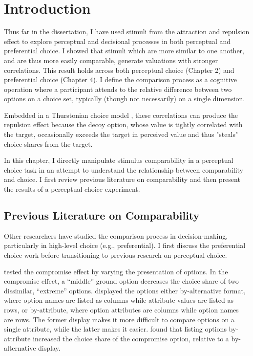 \section{Introduction}

Thus far in the dissertation, I have used stimuli from the attraction and repulsion effect to explore perceptual and decisional processes in both perceptual and preferential choice. I showed that stimuli which are more similar to one another, and are thus more easily comparable, generate valuations with stronger correlations. This result holds across both perceptual choice (Chapter 2) and preferential choice (Chapter 4). I define the comparison process as a cognitive operation where a participant attends to the relative difference between two options on a choice set, typically (though not necessarily) on a single dimension. 

Embedded in a Thurstonian choice model \parencite{thurstone1927law}, these correlations can produce the repulsion effect \parencite{spektorWhenGoodLooks2018b,simonson2014vices} because the decoy option, whose value is tightly correlated with the target, occasionally exceeds the target in perceived value and thus "steals" choice shares from the target. 

In this chapter, I directly manipulate stimulus comparability in a perceptual choice task in an attempt to understand the relationship between comparability and choice. I first review previous literature on comparability and then present the results of a perceptual choice experiment.

\subsection{Previous Literature on Comparability}

Other researchers have studied the comparison process in decision-making, particularly in high-level choice (e.g., preferential). I first discuss the preferential choice work before transitioning to previous research on perceptual choice. 

\textcite{changWhichCompromiseOption2008} tested the compromise effect by varying the presentation of options. In the compromise effect, a “middle” ground option decreases the choice share of two dissimilar, “extreme” options. \textcite{changWhichCompromiseOption2008} displayed the options either by-alternative format, where option names are listed as columns while attribute values are listed as rows, or by-attribute, where option attributes are columns while option names are rows. The former display makes it more difficult to compare options on a single attribute, while the latter makes it easier. \textcite{changWhichCompromiseOption2008} found that listing options by-attribute increased the choice share of the compromise option, relative to a by-alternative display. 

